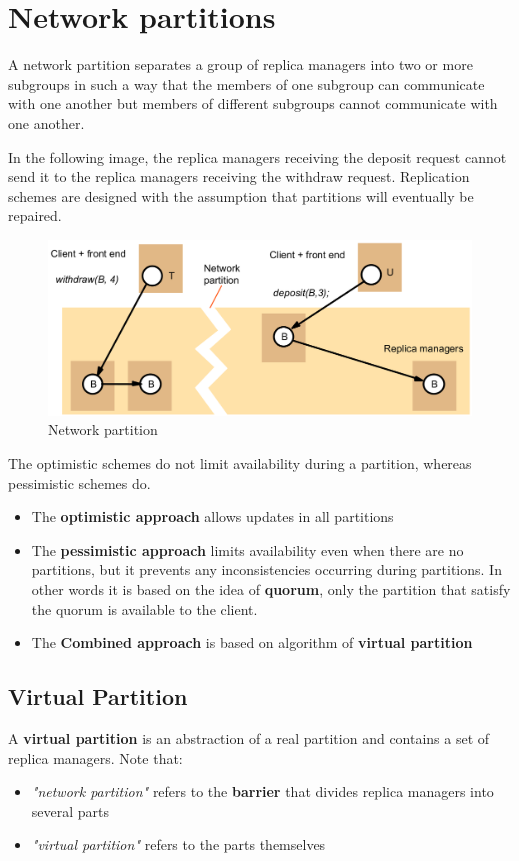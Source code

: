 \section{Network partitions}
A network partition separates a group of replica managers into two or more subgroups in such a way that the members of one subgroup can communicate with one another but members of different subgroups cannot communicate with one another.

In the following image, the replica managers receiving the deposit request cannot send it to the replica managers receiving the withdraw request. Replication schemes are designed with the assumption that partitions will eventually be repaired. 
\begin{figure}[!h]
    \centering
    \includegraphics[width=.70\linewidth]{images/roleGroupCommunication/NetworkPartition.png}
    \caption{Network partition}
\end{figure}
\newpage
The optimistic schemes do not limit availability during a partition, whereas pessimistic schemes do.
\begin{itemize}
    \item The \textbf{optimistic approach} allows updates in all partitions
    \item The \textbf{pessimistic approach} limits availability even when there are no partitions, but it prevents any inconsistencies occurring during partitions. In other words it is based on the idea of \textbf{quorum}, only the partition that satisfy the quorum is available to the client.
    \item The \textbf{Combined approach} is based on algorithm of \textbf{virtual partition}
\end{itemize}



\subsection{Virtual Partition}
A \textbf{virtual partition} is an abstraction of a real partition and contains a set of replica managers.
Note that:
\begin{itemize}
    \item \textit{"network partition"} refers to the \textbf{barrier} that divides replica managers into several parts
    \item \textit{"virtual partition"} refers to the parts themselves
\end{itemize}

